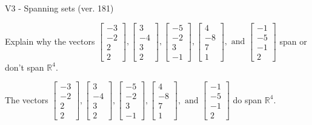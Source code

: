 \begin{exercise}
  \begin{exerciseTitle}V3 - Spanning sets (ver. 181)\end{exerciseTitle}
  \begin{exerciseStatement}
    Explain why the vectors \(\left[\begin{array}{r}
-3 \\
-2 \\
2 \\
2
\end{array}\right] , \left[\begin{array}{r}
3 \\
-4 \\
3 \\
2
\end{array}\right] , \left[\begin{array}{r}
-5 \\
-2 \\
3 \\
-1
\end{array}\right] , \left[\begin{array}{r}
4 \\
-8 \\
7 \\
1
\end{array}\right] , \text{ and } \left[\begin{array}{r}
-1 \\
-5 \\
-1 \\
2
\end{array}\right]\) span or don't span \(\mathbb{R}^4\). 
	


  \end{exerciseStatement}
  \begin{exerciseAnswer}
   The vectors \(\left[\begin{array}{r}
-3 \\
-2 \\
2 \\
2
\end{array}\right] , \left[\begin{array}{r}
3 \\
-4 \\
3 \\
2
\end{array}\right] , \left[\begin{array}{r}
-5 \\
-2 \\
3 \\
-1
\end{array}\right] , \left[\begin{array}{r}
4 \\
-8 \\
7 \\
1
\end{array}\right] , \text{ and } \left[\begin{array}{r}
-1 \\
-5 \\
-1 \\
2
\end{array}\right]\) 
  	 do  
	span \(\mathbb{R}^4\).
  



\end{exerciseAnswer}
\end{exercise}
